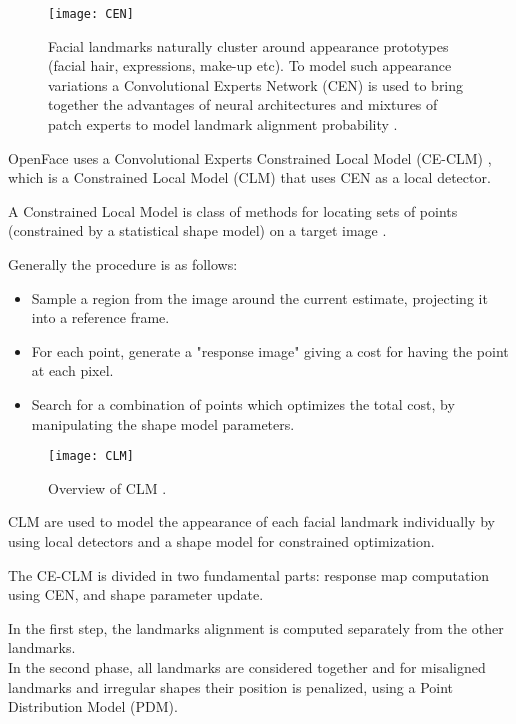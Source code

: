 \begin{figure}[H]
	\centering
	\texttt{[image: CEN]}
	\caption{Facial landmarks naturally cluster around appearance prototypes (facial hair, expressions, make-up etc). To model such appearance variations a Convolutional Experts Network (CEN) is used to bring together the advantages of neural architectures and mixtures of patch experts to model landmark alignment probability \cite{Baltru2017}.}
	\label{fig:CEN}
\end{figure}

OpenFace uses a Convolutional Experts Constrained Local Model (CE-CLM) \cite{Baltru2017}, which is a Constrained Local Model (CLM) that uses CEN as a local detector. 

A Constrained Local Model is class of methods for locating sets of points (constrained by a statistical shape model) on a target image \cite{clm_cootes}.

Generally the procedure is as follows:
\begin{itemize}
	\item Sample a region from the image around the current estimate, projecting it into a reference frame.
	\item For each point, generate a "response image" giving a cost for having the point at each pixel.
	\item Search for a combination of points which optimizes the total cost, by manipulating the shape model parameters.
\end{itemize}

\begin{figure}[H]
	\centering
	\texttt{[image: CLM]}
	\caption{Overview of CLM \cite{clm_cootes}.}
	\label{fig:CLM}
\end{figure}

CLM are used to model the appearance of each facial landmark individually by using local detectors and a shape model for constrained optimization. 

The CE-CLM is divided in two fundamental parts: response map computation using CEN, and shape parameter update.

In the first step, the landmarks alignment is computed separately from the other landmarks. \\
In the second phase, all landmarks are considered together and for misaligned landmarks and irregular shapes their position is penalized, using a Point Distribution Model (PDM).

